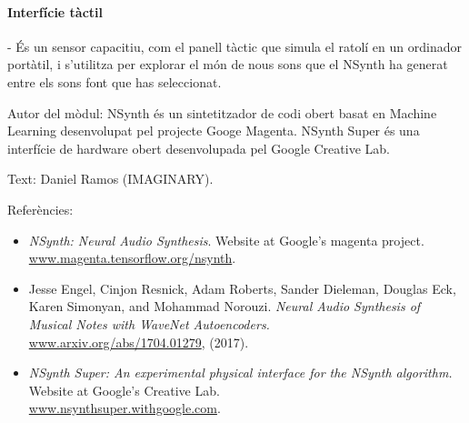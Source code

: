 \paragraph{Interfície tàctil} - És un sensor capacitiu, com el panell tàctic que simula el ratolí en un ordinador portàtil, i s'utilitza per explorar el món de nous sons que el NSynth ha generat entre els sons font que has seleccionat.

\begin{sectcredits}

\item[Autor del mòdul:] NSynth és un sintetitzador de codi obert basat en Machine Learning desenvolupat pel projecte Googe Magenta. NSynth Super és una interfície de hardware obert desenvolupada pel Google Creative Lab.

\item[Text:] Daniel Ramos (IMAGINARY).

\item[Referències:] \strut
\noindent \begin{itemize}[leftmargin=*]

\item \emph{NSynth: Neural Audio Synthesis}. Website at Google's magenta project. \\
\url{www.magenta.tensorflow.org/nsynth}.

\item Jesse Engel, Cinjon Resnick, Adam Roberts, Sander Dieleman, Douglas Eck, Karen Simonyan, and Mohammad Norouzi. \emph{Neural Audio Synthesis of Musical Notes with WaveNet Autoencoders.} \\
\url{www.arxiv.org/abs/1704.01279}, (2017).

\item \emph{NSynth Super: An experimental physical interface for the NSynth algorithm.} Website at Google's Creative Lab.\\ \url{www.nsynthsuper.withgoogle.com}.
\end{itemize}
\end{sectcredits}
